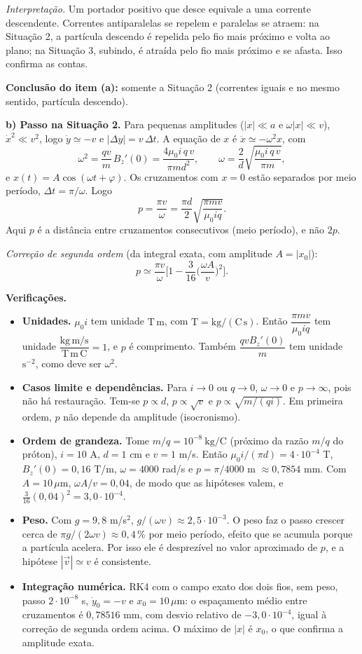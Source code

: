 \documentclass{article}%
\begin{document}
\emph{Interpretação.} Um portador positivo que desce equivale a uma corrente descendente. Correntes antiparalelas se repelem e paralelas se atraem: na Situação 2, a partícula descendo é repelida pelo fio mais próximo e volta ao plano; na Situação 3, subindo, é atraída pelo fio mais próximo e se afasta. Isso confirma as contas.

\textbf{Conclusão do item (a):} somente a Situação 2 (correntes iguais e no mesmo sentido, partícula descendo).

\textbf{b) Passo na Situação 2.} Para pequenas amplitudes ($|x|\ll a$ e $\omega|x|\ll v$), $\dot x^2\ll v^2$, logo $\dot y\simeq -v$ e $|\Delta y|=v\,\Delta t$. A equação de $x$ é $\ddot x\simeq -\omega^2 x$, com
\[
\omega^2=\frac{q v}{m}\,B_z'(0)=\frac{4\mu_0 i\,q\,v}{\pi m d^2},\qquad \omega=\frac{2}{d}\sqrt{\frac{\mu_0 i\,q\,v}{\pi m}},
\]
e $x(t)=A\cos(\omega t+\varphi)$. Os cruzamentos com $x=0$ estão separados por meio período, $\Delta t=\pi/\omega$. Logo
\[
p=\frac{\pi v}{\omega}=\frac{\pi d}{2}\sqrt{\frac{\pi m v}{\mu_0 i q}}.
\]
Aqui $p$ é a distância entre cruzamentos consecutivos (meio período), e não $2p$.

\emph{Correção de segunda ordem} (da integral exata, com amplitude $A=|x_0|$):
\[
p\simeq\frac{\pi v}{\omega}\Big[1-\frac{3}{16}\Big(\frac{\omega A}{v}\Big)^2\Big].
\]

\textbf{Verificações.}
\begin{itemize}
\item \textbf{Unidades.} $\mu_0 i$ tem unidade $\mathrm{T\,m}$, com $\mathrm{T}=\mathrm{kg/(C\,s)}$. Então $\dfrac{\pi m v}{\mu_0 i q}$ tem unidade $\dfrac{\mathrm{kg\,m/s}}{\mathrm{T\,m\,C}}=1$, e $p$ é comprimento. Também $\dfrac{q v B_z'(0)}{m}$ tem unidade $\mathrm{s^{-2}}$, como deve ser $\omega^2$.
\item \textbf{Casos limite e dependências.} Para $i\to 0$ ou $q\to 0$, $\omega\to 0$ e $p\to\infty$, pois não há restauração. Tem-se $p\propto d$, $p\propto\sqrt{v}$ e $p\propto\sqrt{m/(qi)}$. Em primeira ordem, $p$ não depende da amplitude (isocronismo).
\item \textbf{Ordem de grandeza.} Tome $m/q=10^{-8}\ \mathrm{kg/C}$ (próximo da razão $m/q$ do próton), $i=10$ A, $d=1$ cm e $v=1$ m/s. Então $\mu_0 i/(\pi d)=4\cdot 10^{-4}$ T, $B_z'(0)=0{,}16$ T/m, $\omega=4000$ rad/s e $p=\pi/4000$ m $\approx 0{,}7854$ mm. Com $A=10\,\mu$m, $\omega A/v=0{,}04$, de modo que as hipóteses valem, e $\frac{3}{16}(0{,}04)^2=3{,}0\cdot 10^{-4}$.
\item \textbf{Peso.} Com $g=9{,}8$ m/s$^2$, $g/(\omega v)\approx 2{,}5\cdot 10^{-3}$. O peso faz o passo crescer cerca de $\pi g/(2\omega v)\approx 0{,}4\,\%$ por meio período, efeito que se acumula porque a partícula acelera. Por isso ele é desprezível no valor aproximado de $p$, e a hipótese $|\vec v|\simeq v$ é consistente.
\item \textbf{Integração numérica.} RK4 com o campo exato dos dois fios, sem peso, passo $2\cdot 10^{-8}$ s, $\dot y_0=-v$ e $x_0=10\,\mu$m: o espaçamento médio entre cruzamentos é $0{,}78516$ mm, com desvio relativo de $-3{,}0\cdot 10^{-4}$, igual à correção de segunda ordem acima. O máximo de $|x|$ é $x_0$, o que confirma a amplitude exata.
\end{itemize}
\end{document}
